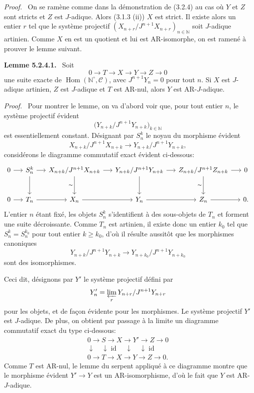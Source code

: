 \documentclass[11pt]{article}
\newenvironment{statement}[1]{\par\medskip\noindent\textbf{#1.}\ }{\par\medskip}
\newenvironment{prooftext}[1][Proof]{\par\noindent\emph{#1.}\ }{\par\medskip}
\DeclareMathOperator{\Hom}{Hom}
\providecommand{\id}{\operatorname{id}}
\providecommand{\Hom}{\operatorname{Hom}}
\providecommand{\id}{\operatorname{id}}
\providecommand{\id}{\operatorname{id}}
\providecommand{\id}{\operatorname{id}}
\providecommand{\id}{\operatorname{id}}
\providecommand{\Hom}{\operatorname{Hom}}
\providecommand{\id}{\operatorname{id}}
\begin{document}
\begin{prooftext}
On se ramène comme dans la démonstration de (3.2.4) au cas où \(Y\) et \(Z\) sont stricts et \(Z\) est \(J\)-adique. Alors (3.1.3 (ii)) \(X\) est strict. Il existe alors un entier \(r\) tel que le système projectif \((X_{n+r}/J^{n+1}X_{n+r})_{n\in\mathbb N}\) soit \(J\)-adique artinien. Comme \(X\) en est un quotient et lui est AR-isomorphe, on est ramené à prouver le lemme suivant.
\end{prooftext}

\begin{statement}{Lemme 5.2.4.1}
Soit
\[
0\longrightarrow T\longrightarrow X\longrightarrow Y\longrightarrow Z\longrightarrow0
\]
une suite exacte de \(\Hom(\mathbb N^\circ,\mathcal C)\), avec \(J^{n+1}Y_n=0\) pour tout \(n\). Si \(X\) est \(J\)-adique artinien, \(Z\) est \(J\)-adique et \(T\) est AR-nul, alors \(Y\) est AR-\(J\)-adique.
\end{statement}

\begin{prooftext}
Pour montrer le lemme, on va d'abord voir que, pour tout entier \(n\), le système projectif évident
\[
\bigl(Y_{n+k}/J^{n+1}Y_{n+k}\bigr)_{k\in\mathbb N}
\]
est essentiellement constant. Désignant par \(S_n^k\) le noyau du morphisme évident
\[
X_{n+k}/J^{n+1}X_{n+k}\longrightarrow
Y_{n+k}/J^{n+1}Y_{n+k},
\]
considérons le diagramme commutatif exact évident ci-dessous:
\[
\begin{tikzcd}[column sep=1.35em,row sep=large]
0 \arrow[r] & S_n^k \arrow[r] \arrow[d] & X_{n+k}/J^{n+1}X_{n+k} \arrow[r] \arrow[d,"\sim"'] & Y_{n+k}/J^{n+1}Y_{n+k} \arrow[r] \arrow[d] & Z_{n+k}/J^{n+1}Z_{n+k} \arrow[r] \arrow[d,"\sim"'] & 0\\
0 \arrow[r] & T_n \arrow[r] & X_n \arrow[r] & Y_n \arrow[r] & Z_n \arrow[r] & 0 .
\end{tikzcd}
\]
L'entier \(n\) étant fixé, les objets \(S_n^k\) s'identifient à des sous-objets de \(T_n\) et forment une suite décroissante. Comme \(T_n\) est artinien, il existe donc un entier \(k_0\) tel que \(S_n^k=S_n^{k_0}\) pour tout entier \(k\ge k_0\), d'où il résulte aussitôt que les morphismes canoniques
\[
Y_{n+k}/J^{n+1}Y_{n+k}
\longrightarrow
Y_{n+k_0}/J^{n+1}Y_{n+k_0}
\]
sont des isomorphismes.

Ceci dit, désignons par \(Y'\) le système projectif défini par
\[
Y'_n=\varprojlim_r Y_{n+r}/J^{n+1}Y_{n+r}
\]
pour les objets, et de façon évidente pour les morphismes. Le système projectif \(Y'\) est \(J\)-adique. De plus, on obtient par passage à la limite un diagramme commutatif exact du type ci-dessous:
\[
\begin{array}{ccccc}
0\to S\to X\to Y'\to Z\to0\\
\downarrow\quad\downarrow\id\quad\downarrow\quad\downarrow\id\\
0\to T\to X\to Y\to Z\to0 .
\end{array}
\]
Comme \(T\) est AR-nul, le lemme du serpent appliqué à ce diagramme montre que le morphisme évident \(Y'\to Y\) est un AR-isomorphisme, d'où le fait que \(Y\) est AR-\(J\)-adique.
\end{prooftext}
\end{document}
